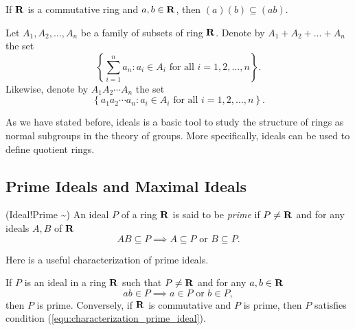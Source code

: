 \begin{rmk}
If $\mathbf{R}$ is a commutative ring and $a, b \in \mathbf{R}$, then $(a)(b) \subseteq 
(ab)$.
\end{rmk}

Let $A_1, A_2, \ldots, A_n$ be a family of subsets of ring $\mathbf{R}$. Denote 
by $A_1 + A_2 + \ldots + A_n$ the set 
\begin{equation*}
    \left\{
        \sum_{i=1}^n a_n: a_i \in A_i \text{ for all } i = 1, 2, \ldots, n
    \right\}.
\end{equation*}
Likewise, denote by $A_1 A_2 \cdots A_n$ the set 
\begin{equation*}
    \left\{
        a_1 a_2 \cdots a_n: a_i \in A_i \text{ for all } i = 1, 2, \ldots, n
    \right\}.
\end{equation*}

As we have stated before, ideals is a basic tool to study the structure of 
rings as normal subgroups in the theory of groups. 
More specifically, ideals can be used to define quotient rings. 
\begin{defn}

\end{defn}


\subsection{Prime Ideals and Maximal Ideals}

\begin{defn}
\index(Ideal!Prime \~{})
An ideal $P$ of a ring $\mathbf{R}$ is said to be \emph{prime} if $P \neq \mathbf{R}$ 
and for any ideals $A, B$ of $\mathbf{R}$ 
\begin{equation}
    AB \subseteq P \implies A \subseteq P \text{ or } B \subseteq P.
\end{equation}
\end{defn}

Here is a useful characterization of prime ideals.
\begin{thm}
\label{thm:prime_ideal_element}
If $P$ is an ideal in a ring $\mathbf{R}$ such that $P \neq \mathbf{R}$ and for any 
$a, b \in \mathbf{R}$ 
\begin{equation}
    \label{equ:characterization_prime_ideal}
    ab \in P \implies a \in P \text{ or } b \in P, 
\end{equation}
then $P$ is prime. Conversely, if $\mathbf{R}$ is commutative and $P$ is prime, 
then $P$ satisfies condition (\ref{equ:characterization_prime_ideal}).
\end{thm}

